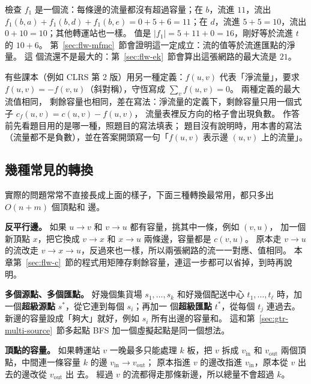 檢查 $f_1$ 是一個流：每條邊的流量都沒有超過容量；在 $b$，流進 $11$，流出
$f_1(b, a) + f_1(b, d) + f_1(b, e) = 0 + 5 + 6 = 11$；在 $d$，流進 $5 + 5 = 10$，流出
$0 + 10 = 10$；其他轉運站也一樣。 值是 $|f_1| = 5 + 11 + 0 = 16$，剛好等於流進 $t$ 的
$10 + 6$。 第~\ref{sec:flw-mfmc}~節會證明這一定成立：流的值等於流進匯點的淨量。 這
個流還不是最大的：第~\ref{sec:flw-ek}~節會算出這張網路的最大流是 $21$。

\begin{examnote}
有些課本（例如 CLRS 第 2 版）用另一種定義：$f(u, v)$ 代表「淨流量」，要求
$f(u, v) = -f(v, u)$（斜對稱），守恆寫成 $\sum_{v} f(u, v) = 0$。 兩種定義的最大流值相同，
剩餘容量也相同，差在寫法：淨流量的定義下，剩餘容量只用一個式子 $c_f(u, v) = c(u, v) - f(u, v)$，
流量表裡反方向的格子會出現負數。 作答前先看題目用的是哪一種，照題目的寫法填表；
題目沒有說明時，用本書的寫法（流量都不是負數），並在答案開頭寫一句「$f(u, v)$ 表示邊
$(u, v)$ 上的流量」。
\end{examnote}

\subsection{幾種常見的轉換}
\label{sec:flw-model}

實際的問題常常不直接長成上面的樣子，下面三種轉換最常用，都只多出 $O(n + m)$ 個頂點和
邊。

\textbf{反平行邊。} 如果 $u \to v$ 和 $v \to u$ 都有容量，挑其中一條，例如 $(v, u)$，
加一個新頂點 $x$，把它換成 $v \to x$ 和 $x \to u$ 兩條邊，容量都是 $c(v, u)$。 原本走
$v \to u$ 的流改走 $v \to x \to u$，反過來也一樣，所以兩張網路的流一一對應、值相同。
本章第~\ref{sec:flw-c}~節的程式用矩陣存剩餘容量，連這一步都可以省掉，到時再說明。

\textbf{多個源點、多個匯點。} 好幾個集貨場 $s_1, \ldots, s_k$ 和好幾個配送中心
$t_1, \ldots, t_\ell$ 時，加一個\textbf{超級源點} $s^{*}$，從它連到每個 $s_i$；再加一
個\textbf{超級匯點} $t^{*}$，從每個 $t_j$ 連過去。 新邊的容量設成「夠大」就好，例如
$s_i$ 所有出邊的容量和。 這和第~\ref{sec:gtr-multi-source}~節多起點 BFS 加一個虛擬起點是同一個想法。

\textbf{頂點的容量。} 如果轉運站 $v$ 一晚最多只能處理 $k$ 板，把 $v$ 拆成 $v_{\mathrm{in}}$
和 $v_{\mathrm{out}}$ 兩個頂點，中間連一條容量 $k$ 的邊 $v_{\mathrm{in}} \to v_{\mathrm{out}}$；
原本指進 $v$ 的邊改指進 $v_{\mathrm{in}}$，原本從 $v$ 出去的邊改從 $v_{\mathrm{out}}$ 出
去。 經過 $v$ 的流都得走那條新邊，所以總量不會超過 $k$。

